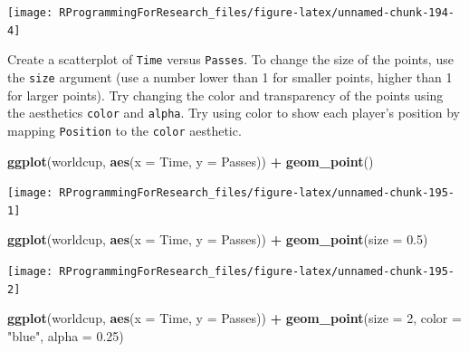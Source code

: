 \documentclass[]{book}
\makeatletter
\newenvironment{Shaded}{\begin{snugshade}}{\end{snugshade}}
\newcommand{\KeywordTok}[1]{\textcolor[rgb]{0.13,0.29,0.53}{\textbf{#1}}}
\newcommand{\DataTypeTok}[1]{\textcolor[rgb]{0.13,0.29,0.53}{#1}}
\newcommand{\DecValTok}[1]{\textcolor[rgb]{0.00,0.00,0.81}{#1}}
\newcommand{\FloatTok}[1]{\textcolor[rgb]{0.00,0.00,0.81}{#1}}
\newcommand{\StringTok}[1]{\textcolor[rgb]{0.31,0.60,0.02}{#1}}
\newcommand{\OperatorTok}[1]{\textcolor[rgb]{0.81,0.36,0.00}{\textbf{#1}}}
\newcommand{\NormalTok}[1]{#1}
\newenvironment{kframe}{%
\medskip{}
\setlength{\fboxsep}{.8em}
 \def\at@end@of@kframe{}%
 \ifinner\ifhmode%
  \def\at@end@of@kframe{\end{minipage}}%
  \begin{minipage}{\columnwidth}%
 \fi\fi%
 \def\FrameCommand##1{\hskip\@totalleftmargin \hskip-\fboxsep
 \colorbox{shadecolor}{##1}\hskip-\fboxsep
     \hskip-\linewidth \hskip-\@totalleftmargin \hskip\columnwidth}%
 \MakeFramed {\advance\hsize-\width
   \@totalleftmargin\z@ \linewidth\hsize
   \@setminipage}}%
 {\par\unskip\endMakeFramed%
 \at@end@of@kframe}
\renewenvironment{Shaded}{\begin{kframe}}{\end{kframe}}
\theoremstyle{definition}
\theoremstyle{definition}
\theoremstyle{definition}
\theoremstyle{remark}
\makeatother
\begin{document}
\begin{center}\texttt{[image: RProgrammingForResearch\_files/figure-latex/unnamed-chunk-194-4]} \end{center}

Create a scatterplot of \texttt{Time} versus \texttt{Passes}. To change
the size of the points, use the \texttt{size} argument (use a number
lower than 1 for smaller points, higher than 1 for larger points). Try
changing the color and transparency of the points using the aesthetics
\texttt{color} and \texttt{alpha}. Try using color to show each player's
position by mapping \texttt{Position} to the \texttt{color} aesthetic.

\begin{Shaded}
\begin{Highlighting}[]
\KeywordTok{ggplot}\NormalTok{(worldcup, }\KeywordTok{aes}\NormalTok{(}\DataTypeTok{x =}\NormalTok{ Time, }\DataTypeTok{y =}\NormalTok{ Passes)) }\OperatorTok{+}\StringTok{ }
\StringTok{  }\KeywordTok{geom_point}\NormalTok{()}
\end{Highlighting}
\end{Shaded}

\begin{center}\texttt{[image: RProgrammingForResearch\_files/figure-latex/unnamed-chunk-195-1]} \end{center}

\begin{Shaded}
\begin{Highlighting}[]
\KeywordTok{ggplot}\NormalTok{(worldcup, }\KeywordTok{aes}\NormalTok{(}\DataTypeTok{x =}\NormalTok{ Time, }\DataTypeTok{y =}\NormalTok{ Passes)) }\OperatorTok{+}\StringTok{ }
\StringTok{  }\KeywordTok{geom_point}\NormalTok{(}\DataTypeTok{size =} \FloatTok{0.5}\NormalTok{)}
\end{Highlighting}
\end{Shaded}

\begin{center}\texttt{[image: RProgrammingForResearch\_files/figure-latex/unnamed-chunk-195-2]} \end{center}

\begin{Shaded}
\begin{Highlighting}[]
\KeywordTok{ggplot}\NormalTok{(worldcup, }\KeywordTok{aes}\NormalTok{(}\DataTypeTok{x =}\NormalTok{ Time, }\DataTypeTok{y =}\NormalTok{ Passes)) }\OperatorTok{+}\StringTok{ }
\StringTok{  }\KeywordTok{geom_point}\NormalTok{(}\DataTypeTok{size =} \DecValTok{2}\NormalTok{, }\DataTypeTok{color =} \StringTok{"blue"}\NormalTok{, }\DataTypeTok{alpha =} \FloatTok{0.25}\NormalTok{)}
\end{Highlighting}
\end{Shaded}
\end{document}
